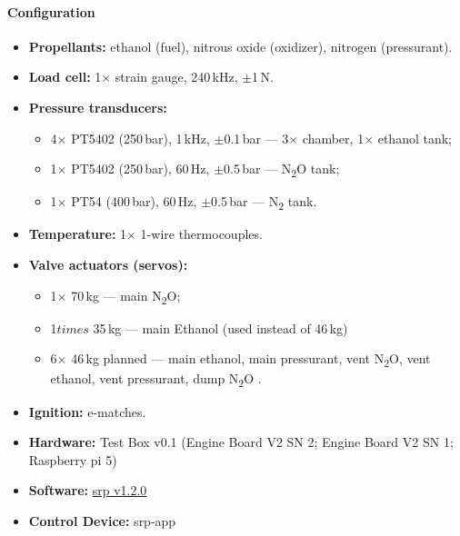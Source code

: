 \paragraph{Configuration}
\begin{itemize}
  \item \textbf{Propellants:} ethanol (fuel), nitrous oxide (oxidizer), nitrogen
    (pressurant).
  \item \textbf{Load cell:} 1$\times$ strain gauge, 240\,kHz, $\pm$1\,N.
  \item \textbf{Pressure transducers:}
    \begin{itemize}
      \item 4$\times$ PT5402 (250\,bar), 1\,kHz, $\pm$0.1\,bar --- 3$\times$
        chamber, 1$\times$ ethanol tank;
      \item 1$\times$ PT5402 (250\,bar), 60\,Hz, $\pm$0.5\,bar --- N\textsubscript{2}O
        tank;
      \item 1$\times$ PT54 (400\,bar), 60\,Hz, $\pm$0.5\,bar --- N\textsubscript{2}
        tank.
    \end{itemize}
  \item \textbf{Temperature:} 1$\times$ 1-wire thermocouples.
  \item \textbf{Valve actuators (servos):}
    \begin{itemize}
      \item 1$\times$ 70\,kg --- main N\textsubscript{2}O;
      \item 1$times$ 35\,kg --- main Ethanol (used instead of 46\,kg)
      \item 6$\times$ 46\,kg planned --- main ethanol, main pressurant, vent
        N\textsubscript{2}O, vent ethanol, vent pressurant, dump N\textsubscript{2}O
        .
    \end{itemize}
  \item \textbf{Ignition:} e-matches.
  \item \textbf{Hardware:} Test Box v0.1 (Engine Board V2 SN 2; Engine Board V2 SN 1; Raspberry pi 5)
  \item \textbf{Software:} \href{https://github.com/Simba-Avionic/srp/releases/tag/v1.2.0}{srp v1.2.0}
  \item \textbf{Control Device:} srp-app
\end{itemize}

